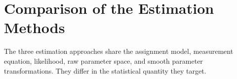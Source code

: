 \section{Comparison of the Estimation Methods}

The three estimation approaches share the assignment model, measurement equation,
likelihood, raw parameter space, and smooth parameter transformations. They differ
in the statistical quantity they target.

